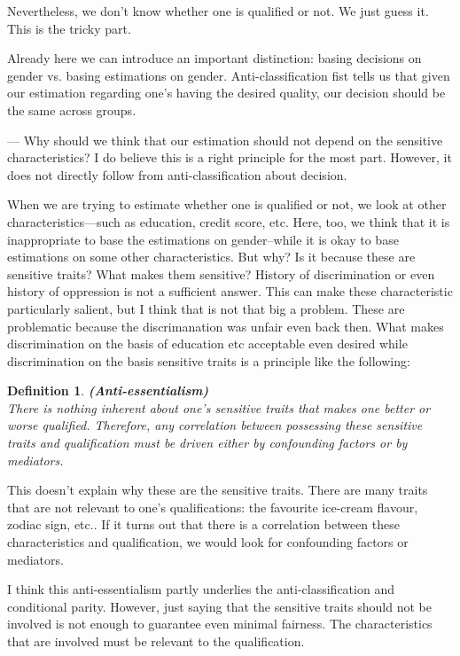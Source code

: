 \documentclass{article}
\newtheorem{definition}{Definition}
\begin{document}
Nevertheless, we don't know whether one is qualified or not. We just guess it. This is the tricky part. 

Already here we can introduce an important distinction: basing decisions on gender vs. basing estimations on gender. Anti-classification fist tells us that given our estimation regarding one's having the desired quality, our decision should be the same across groups. 

--- Why should we think that our estimation should not depend on the sensitive characteristics? I do believe this is a right principle for the most part. However, it does not directly follow from anti-classification about decision. 

When we are trying to estimate whether one is qualified or not, we look at other characteristics---such as education, credit score, etc. Here, too, we think that it is inappropriate to base the estimations on gender--while it is okay to base estimations on some other characteristics. But why? Is it because these are sensitive traits? What makes them sensitive? History of discrimination or even history of oppression is not a sufficient answer. This can make these characteristic particularly salient, but I think that is not that big a problem. These are problematic because the discrimanation was unfair even back then. What makes discrimination on the basis of education etc acceptable even desired while discrimination on the basis sensitive traits is a principle like the following:

\begin{definition}
\textup{\textbf{ (Anti-essentialism) } \\
There is nothing \textit{inherent} about one’s sensitive traits that makes one better or worse qualified. Therefore, any correlation between possessing these sensitive traits and qualification must be driven either by confounding factors or by mediators.}
\end{definition}

This doesn't explain why these are the sensitive traits. There are many traits that are not relevant to one's qualifications: the favourite ice-cream flavour, zodiac sign, etc.. If it turns out that there is a correlation between these characteristics and qualification, we would look for confounding factors or mediators. 

I think this anti-essentialism partly underlies the anti-classification and conditional parity. However, just saying that the sensitive traits should not be involved is not enough to guarantee even minimal fairness. The characteristics that are involved must be relevant to the qualification. 
\end{document}

